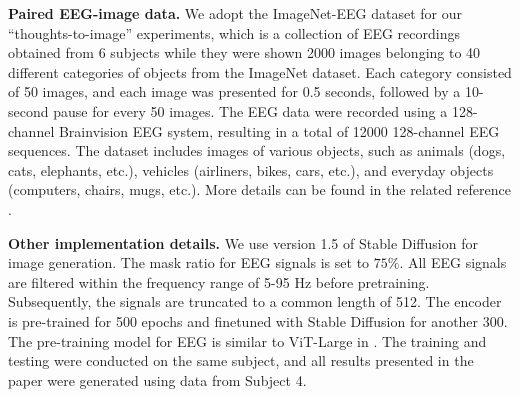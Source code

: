 \documentclass[10pt,twocolumn,letterpaper]{article}
\begin{document}


\noindent\textbf{Paired EEG-image data.} We adopt the ImageNet-EEG \cite{DBLP:conf/mm/KavasidisPSGS17} dataset for our ``thoughts-to-image'' experiments, which is a collection of EEG recordings obtained from 6 subjects while they were shown 2000 images belonging to 40 different categories of objects from the ImageNet dataset. Each category consisted of 50 images, and each image was presented for 0.5 seconds, followed by a 10-second pause for every 50 images. The EEG data were recorded using a 128-channel Brainvision EEG system, resulting in a total of 12000 128-channel EEG sequences. The dataset includes images of various objects, such as animals (dogs, cats, elephants, etc.), vehicles (airliners, bikes, cars, etc.), and everyday objects (computers, chairs, mugs, etc.). More details can be found in the related reference \cite{DBLP:conf/mm/KavasidisPSGS17}.

\noindent\textbf{Other implementation details.} We use version 1.5 of Stable Diffusion for image generation. The mask ratio for EEG signals is set to $75\%$. All EEG signals are filtered within the frequency range of 5-95 Hz before pretraining. Subsequently, the signals are truncated to a common length of 512. The encoder is pre-trained for 500 epochs and finetuned with Stable Diffusion for another 300. The pre-training model for EEG is similar to ViT-Large in \cite{dosovitskiy2020image}. The training and testing were conducted on the same subject, and all results presented in the paper were generated using data from Subject 4. 
\end{document}
